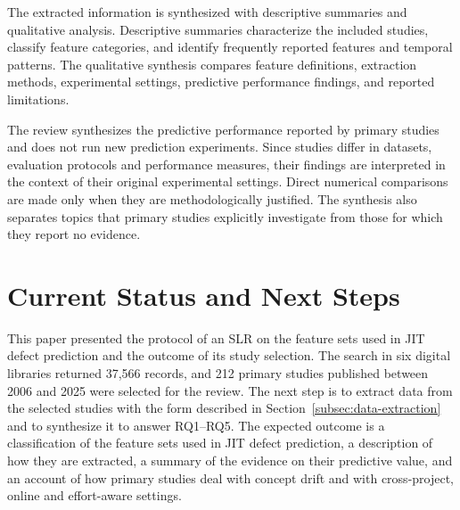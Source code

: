 \documentclass[sigconf,review]{acmart}
\begin{document}
The extracted information is synthesized with descriptive summaries and qualitative analysis. Descriptive summaries characterize the included studies, classify feature categories, and identify frequently reported features and temporal patterns. The qualitative synthesis compares feature definitions, extraction methods, experimental settings, predictive performance findings, and reported limitations.

The review synthesizes the predictive performance reported by primary studies and does not run new prediction experiments. Since studies differ in datasets, evaluation protocols and performance measures, their findings are interpreted in the context of their original experimental settings. Direct numerical comparisons are made only when they are methodologically justified. The synthesis also separates topics that primary studies explicitly investigate from those for which they report no evidence.

\section{Current Status and Next Steps}
\label{S:status}

This paper presented the protocol of an SLR on the feature sets used in JIT defect prediction and the outcome of its study selection. The search in six digital libraries returned 37,566 records, and 212 primary studies published between 2006 and 2025 were selected for the review. The next step is to extract data from the selected studies with the form described in Section~\ref{subsec:data-extraction} and to synthesize it to answer RQ1--RQ5. The expected outcome is a classification of the feature sets used in JIT defect prediction, a description of how they are extracted, a summary of the evidence on their predictive value, and an account of how primary studies deal with concept drift and with cross-project, online and effort-aware settings.



\end{document}
